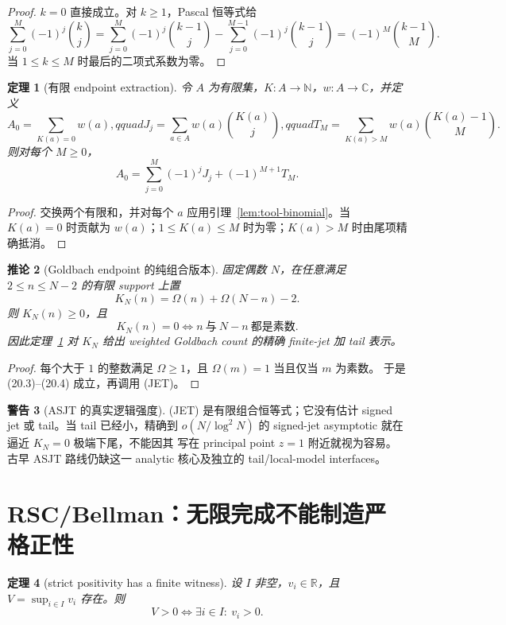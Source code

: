 \documentclass[11pt,a4paper]{ctexart}
\newtheorem{theorem}{定理}[section]
\newtheorem{corollary}[theorem]{推论}
\theoremstyle{definition}
\newtheorem{warning}[theorem]{警告}
\newcommand{\C}{\mathbb C}
\newcommand{\1}{\mathbf 1}
\begin{document}
\begin{proof}
$k=0$ 直接成立。对 $k\ge1$，Pascal 恒等式给
\[
\sum_{j=0}^M(-1)^j\binom kj
=\sum_{j=0}^M(-1)^j\binom{k-1}j
-\sum_{j=0}^{M-1}(-1)^j\binom{k-1}j
=(-1)^M\binom{k-1}M.
\]
当 $1\le k\le M$ 时最后的二项式系数为零。
\end{proof}

\begin{theorem}[有限 endpoint extraction]\label{thm:tool-jet}
令 $A$ 为有限集，$K:A\to\mathbb N$，$w:A\to\C$，并定义
\[
A_0=\sum_{K(a)=0}w(a),qquad
J_j=\sum_{a\in A}w(a)\binom{K(a)}j,qquad
T_M=\sum_{K(a)>M}w(a)\binom{K(a)-1}M.                 \tag{20.2}
\]
则对每个 $M\ge0$，
\[
\boxed{A_0=\sum_{j=0}^M(-1)^jJ_j+(-1)^{M+1}T_M.}     \tag{JET}
\]
\end{theorem}

\begin{proof}
交换两个有限和，并对每个 $a$ 应用引理~\ref{lem:tool-binomial}。当 $K(a)=0$
时贡献为 $w(a)$；$1\le K(a)\le M$ 时为零；$K(a)>M$ 时由尾项精确抵消。
\end{proof}

\begin{corollary}[Goldbach endpoint 的纯组合版本]
固定偶数 $N$，在任意满足 $2\le n\le N-2$ 的有限 support 上置
\[
K_N(n)=\Omega(n)+\Omega(N-n)-2.                       \tag{20.3}
\]
则 $K_N(n)\ge0$，且
\[
K_N(n)=0\iff n\ \text{与}\ N-n\ \text{都是素数}.   \tag{20.4}
\]
因此定理~\ref{thm:tool-jet} 对 $K_N$ 给出 weighted Goldbach count 的精确
finite-jet 加 tail 表示。
\end{corollary}

\begin{proof}
每个大于 $1$ 的整数满足 $\Omega\ge1$，且 $\Omega(m)=1$ 当且仅当 $m$ 为素数。
于是 (20.3)--(20.4) 成立，再调用 (JET)。
\end{proof}

\begin{warning}[ASJT 的真实逻辑强度]
(JET) 是有限组合恒等式；它没有估计 signed jet 或 tail。当 tail 已经小，精确到
$o(N/\log^2N)$ 的 signed-jet asymptotic 就在逼近 $K_N=0$ 极端下尾，不能因其
写在 principal point $z=1$ 附近就视为容易。古早 ASJT 路线仍缺这一 analytic
核心及独立的 tail/local-model interfaces。
\end{warning}

\section{RSC/Bellman：无限完成不能制造严格正性}

\begin{theorem}[strict positivity has a finite witness]\label{thm:tool-finite-witness}
设 $I$ 非空，$v_i\in\mathbb R$，且 $V=\sup_{i\in I}v_i$ 存在。则
\[
\boxed{V>0\iff\exists i\in I:\ v_i>0.}               \tag{21.1}
\]
\end{theorem}
\end{document}

